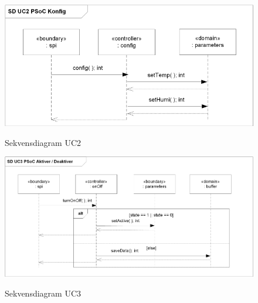 \begin{figure}[htbp] \centering
{\includegraphics[scale=1]{filer/design/a_psoc_uc2}}
\caption{Sekvensdiagram UC2}
\label{fig:psoc_sd_uc2}
\end{figure} 

\begin{figure}[htbp] \centering
{\includegraphics[scale=1]{filer/design/a_psoc_uc3}}
\caption{Sekvensdiagram UC3}
\label{fig:psoc_sd_uc3}
\end{figure} 

